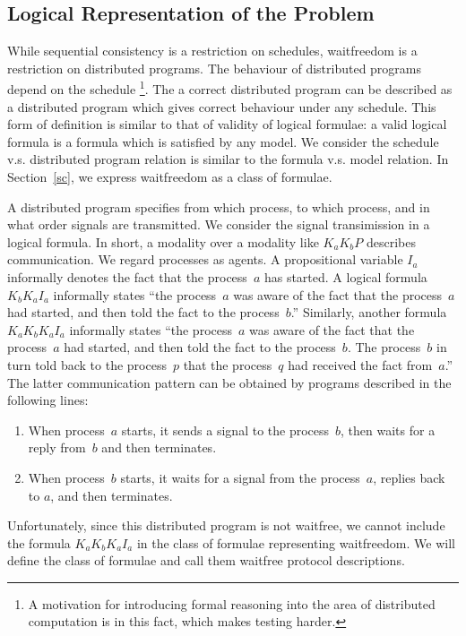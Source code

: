   \subsection{Logical Representation of the Problem}

  While sequential consistency is a restriction on schedules,
  waitfreedom is a restriction on distributed programs.
  The behaviour of distributed programs depend on the schedule%
  \footnote{A motivation for introducing formal reasoning into the area of distributed
  computation is in this fact, which makes testing harder.}.
  The a correct distributed program can be described as
  a distributed program which gives correct behaviour under any schedule.
  This form of definition is similar to that of validity of logical formulae:
  a valid logical formula is a formula which is satisfied by any model.
  We consider the schedule v.s. distributed program relation is similar to
  the formula v.s. model relation.
   In Section~\ref{sc},
  we express waitfreedom as a class of formulae.

  A distributed program specifies
  from which process, to which process, and in what order
  signals are transmitted.
  We consider the signal transimission in a logical formula.
  In short, a modality over a modality like $K_a K_b P$ describes communication.
  We regard processes as agents.
  A propositional variable $I_a$ informally denotes the fact that the process~$a$ has
  started.
  A logical formula $K_b K_a I_a$ informally states
  ``the process~$a$ was aware of the fact that the process~$a$ had started,
  and then told the fact to the process~$b$.''
  Similarly, another formula $K_a K_b K_a I_a$ informally states
  ``the process~$a$ was aware of the fact that the process~$a$ had started,
  and then told the fact to the process~$b$. The process~$b$ in turn told back to the
  process~$p$ that the process~$q$ had received the fact from~$a$.''
  The latter communication pattern can be obtained by programs described in the following lines:
  \begin{enumerate}
   \item When process~$a$ starts, it sends a signal to the process~$b$, then waits for a
	 reply from~$b$ and then terminates.
   \item When process~$b$ starts, it waits for a signal from the process~$a$,
	 replies back to $a$, and then terminates.
  \end{enumerate}
  Unfortunately,
  since this distributed program is not waitfree,
  we cannot include the formula
  $K_a K_b K_a I_a$
  in the class of formulae representing waitfreedom.
  We will define the class of formulae and call them waitfree protocol descriptions.

